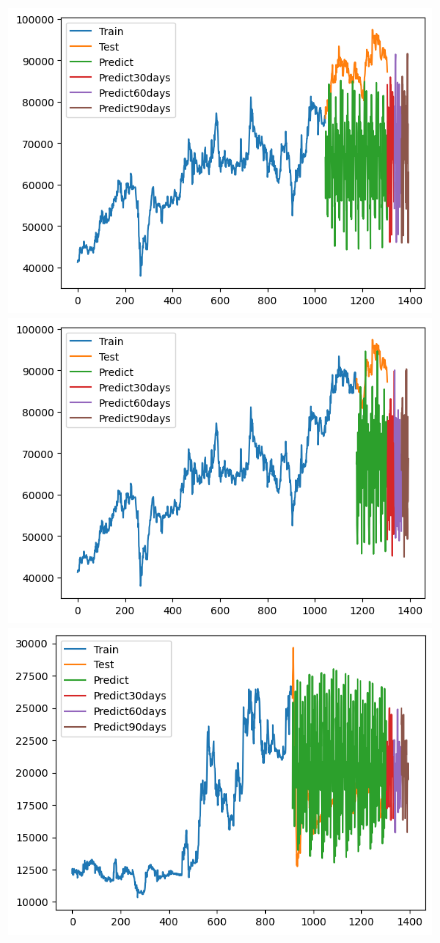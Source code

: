 \begin{figure}[H]
\begin{minipage}{0.15\textwidth}
    \includegraphics[width=1\textwidth]{resources/chapter-5/newdata1/result/VCB_ML_8_2.png}
    \end{minipage}
    \hfill
        \begin{minipage}{0.15\textwidth}
    \centering
    \includegraphics[width=1\textwidth]{resources/chapter-5/newdata1/result/VCB_ML_9_1.png}
    \end{minipage}
    \hfill
    \begin{minipage}{0.15\textwidth}
    \centering
    \includegraphics[width=1\textwidth]{resources/chapter-5/newdata1/result/EXB_ML_7_3.png}

\end{minipage}
\end{figure}
